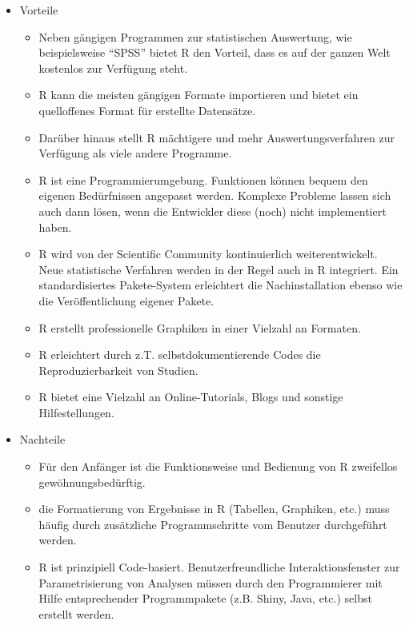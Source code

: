 \documentclass[]{article}
\providecommand{\tightlist}{%
  \setlength{\itemsep}{0pt}\setlength{\parskip}{0pt}}
\begin{document}
\begin{itemize}
\tightlist
\item
  Vorteile

  \begin{itemize}
  \tightlist
  \item
    Neben gängigen Programmen zur statistischen Auswertung, wie
    beispielsweise ``SPSS'' bietet R den Vorteil, dass es auf der ganzen
    Welt kostenlos zur Verfügung steht.
  \item
    R kann die meisten gängigen Formate importieren und bietet ein
    quelloffenes Format für erstellte Datensätze.
  \item
    Darüber hinaus stellt R mächtigere und mehr Auswertungsverfahren zur
    Verfügung als viele andere Programme.
  \item
    R ist eine Programmierumgebung. Funktionen können bequem den eigenen
    Bedürfnissen angepasst werden. Komplexe Probleme lassen sich auch
    dann lösen, wenn die Entwickler diese (noch) nicht implementiert
    haben.
  \item
    R wird von der Scientific Community kontinuierlich weiterentwickelt.
    Neue statistische Verfahren werden in der Regel auch in R
    integriert. Ein standardisiertes Pakete-System erleichtert die
    Nachinstallation ebenso wie die Veröffentlichung eigener Pakete.
  \item
    R erstellt professionelle Graphiken in einer Vielzahl an Formaten.
  \item
    R erleichtert durch z.T. selbstdokumentierende Codes die
    Reproduzierbarkeit von Studien.
  \item
    R bietet eine Vielzahl an Online-Tutorials, Blogs und sonstige
    Hilfestellungen.
  \end{itemize}
\item
  Nachteile

  \begin{itemize}
  \tightlist
  \item
    Für den Anfänger ist die Funktionsweise und Bedienung von R
    zweifellos gewöhnungsbedürftig.
  \item
    die Formatierung von Ergebnisse in R (Tabellen, Graphiken, etc.)
    muss häufig durch zusätzliche Programmschritte vom Benutzer
    durchgeführt werden.
  \item
    R ist prinzipiell Code-basiert. Benutzerfreundliche
    Interaktionsfenster zur Parametrisierung von Analysen müssen durch
    den Programmierer mit Hilfe entsprechender Programmpakete (z.B.
    Shiny, Java, etc.) selbst erstellt werden.
  \end{itemize}
\end{itemize}
\end{document}
